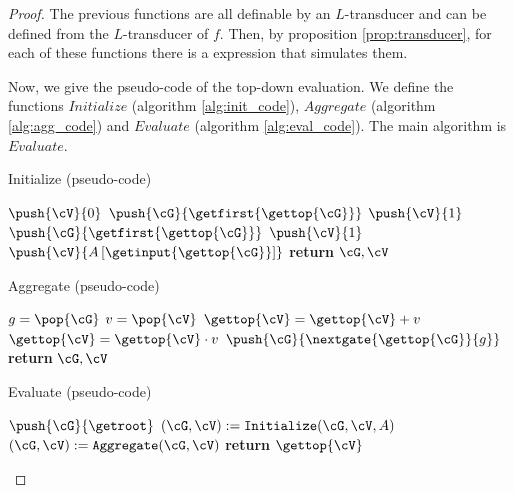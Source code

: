 \begin{proof}
The previous functions are all definable by an $L$-transducer and can be defined from the $L$-transducer of $f$. Then, by proposition \ref{prop:transducer}, for each of these functions there is a \langfor expression that simulates them.

Now, we give the pseudo-code of the top-down evaluation. We define the functions $Initialize$ (algorithm \ref{alg:init_code}), $Aggregate$ (algorithm \ref{alg:agg_code}) and $Evaluate$ (algorithm \ref{alg:eval_code}). The main algorithm is $Evaluate$.

\begin{algorithm}
\caption{Initialize (pseudo-code)}\label{alg:init_code}
\begin{algorithmic}[1]
	\If{$\isplus{\gettop{\cG}}$}
		\State $\push{\cV}{0}$
		\State $\push{\cG}{\getfirst{\gettop{\cG}}}$
	\ElsIf{$\isprod{\gettop{\cG}}$}
		\State $\push{\cV}{1}$
		\State $\push{\cG}{\getfirst{\gettop{\cG}}}$
	\ElsIf{$\isone{\gettop{\cG}}$}
		\State $\push{\cV}{1}$
	\ElsIf{$\isinput{\gettop{\cG}}$}
		\State $\push{\cV}{A\left[ \getinput{\gettop{\cG}} \right]}$
	\EndIf
	\State \textbf{return} $\cG, \cV$
\EndFunction
\end{algorithmic}
\end{algorithm}

\begin{algorithm}
\caption{Aggregate (pseudo-code)}\label{alg:agg_code}
\begin{algorithmic}[1]
	\State $g = \pop{\cG}$
	\State $v = \pop{\cV}$
	\If{$\isplus{\gettop{\cG}}$}
		\State $\gettop{\cV} = \gettop{\cV} + v$
	\ElsIf{$\isprod{\gettop{\cG}}$}
		\State $\gettop{\cV} = \gettop{\cV} \cdot v$
	\EndIf
		\State $\push{\cG}{\nextgate{\gettop{\cG}}{g}}$
	\EndIf
	\State \textbf{return} $\cG, \cV$
\EndFunction
\end{algorithmic}
\end{algorithm}

\begin{algorithm}
\caption{Evaluate (pseudo-code)}\label{alg:eval_code}
\begin{algorithmic}[1]
	\State $\push{\cG}{\getroot}$
			\State $(\cG,\cV) := \texttt{Initialize}(\cG,\cV,A)$
		\Else
			\State $(\cG,\cV):= \texttt{Aggregate}(\cG,\cV)$
		\EndIf
	\EndWhile
	\State \textbf{return} $\gettop{\cV}$
\EndFunction
\end{algorithmic}
\end{algorithm}


\end{proof}
